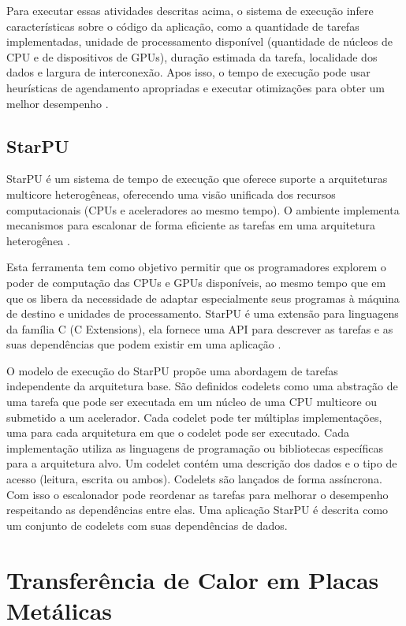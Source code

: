 Para executar essas atividades descritas acima, o sistema de execução infere características sobre o código da aplicação, como a quantidade de tarefas implementadas, unidade de processamento disponível (quantidade de núcleos de CPU e de dispositivos de GPUs), duração estimada da tarefa, localidade dos dados e largura de interconexão.
Apos isso, o tempo de execução pode usar heurísticas de agendamento apropriadas e executar otimizações para obter um melhor desempenho \cite{pinto2017visual}.

\subsection{StarPU}
StarPU é um sistema de tempo de execução que oferece suporte a arquiteturas multicore heterogêneas, oferecendo uma visão unificada dos recursos computacionais (CPUs e aceleradores ao mesmo tempo).
O ambiente implementa mecanismos para escalonar de forma eficiente as tarefas em uma arquitetura heterogênea \cite{augonnet2011scheduling}. 

Esta ferramenta tem como objetivo permitir que os programadores explorem o poder de computação das CPUs e GPUs disponíveis, ao mesmo tempo que em que os libera da necessidade de adaptar especialmente seus programas à máquina de destino e unidades de processamento.
StarPU é uma extensão para linguagens da família C (C Extensions), ela fornece uma API para descrever as tarefas e as suas dependências que podem existir em uma aplicação \cite{augonnet2011scheduling}.

\begin{citacao}
O modelo de execução do StarPU propõe uma abordagem de tarefas independente da arquitetura base.
São definidos codelets como uma abstração de uma tarefa que pode ser executada em um núcleo de uma CPU multicore ou submetido a um acelerador.
Cada codelet pode ter múltiplas implementações, uma para cada arquitetura em que o codelet pode ser executado.
Cada implementação utiliza as linguagens de programação ou bibliotecas específicas para a arquitetura alvo.
Um codelet contém uma descrição dos dados e o tipo de acesso (leitura, escrita ou ambos).
Codelets são lançados de forma assíncrona. Com isso o escalonador pode reordenar as tarefas para melhorar o desempenho respeitando as dependências entre elas.
Uma aplicação StarPU é descrita como um conjunto de codelets com suas dependências de dados. \cite[p.~26]{pinto2011ambientes}
\end{citacao}
\section{Transferência de Calor em Placas Metálicas}